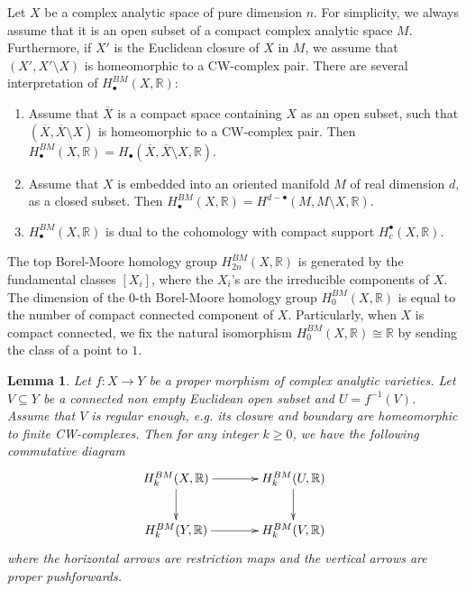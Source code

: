 \documentclass[12pt]{amsart}
\newcommand{\<}{\leq}
\def\>{\geq}
\newtheorem{lemma}[theorem]{Lemma}
\theoremstyle{remark}
\theoremstyle{definition}
\theoremstyle{definition}
\numberwithin{equation}{section}
\theoremstyle{definition}
\theoremstyle{definition}
\begin{document}
Let $X$ be a complex analytic space of pure dimension $n$. 
For simplicity, we always assume that it is an open subset of a compact complex analytic space $M$. 
Furthermore, if ${X}'$ is the Euclidean closure of $X$ in $M$, we assume that $( {X}',  {X}'\setminus X)$ is homeomorphic to a   CW-complex pair.  
There are several interpretation of $H^{BM}_\bullet(X, \mathbb{R})$: 
\begin{enumerate}
\item Assume that $\overline{X}$ is a compact space  containing $X$ as an open subset, such that $(\overline{X}, \overline X\setminus X)$ is homeomorphic to a CW-complex pair. 
Then $H^{BM}_\bullet(X, \mathbb{R}) = H_\bullet (\overline{X}, \overline{X}\setminus X, \mathbb{R}).$

\item Assume that $X$ is embedded into an oriented manifold $M$ of real dimension $d$, as a closed subset. 
Then  $H^{BM}_\bullet(X, \mathbb{R}) = H^{d-\bullet} (M, M\setminus X, \mathbb{R}).$

\item $H^{BM}_\bullet(X, \mathbb{R})$ is dual to the cohomology with compact support $H^\bullet_c(X,\mathbb{R})$. 
\end{enumerate}
 


The top Borel-Moore homology group $H^{BM}_{2n}(X, \mathbb{R})$ is generated by the fundamental classes  $[X_i]$, where the $X_i$'s are the irreducible components of $X$.  
The dimension of the $0$-th  Borel-Moore homology group $H^{BM}_{0}(X, \mathbb{R})$ is equal to the number of compact connected component of $X$.  
Particularly, when $X$ is compact connected,  we fix the natural isomorphism $H^{BM}_{0}(X, \mathbb{R}) \cong \mathbb{R}$ by sending the class of a point to $1$.


\begin{lemma}
\label{lemma:BM-commute-basechange}
Let $f\colon X\to Y$ be a proper morphism of complex analytic varieties. 
Let $V\subseteq Y$ be a connected non empty Euclidean open subset and $U=f^{-1}(V)$. 
Assume that $V$ is regular enough, \textit{e.g.} its closure and boundary are homeomorphic to finite CW-complexes. 
Then  for any integer $k\> 0$, we have the following commutative diagram 
\begin{equation*}
  \xymatrixcolsep{3pc}
  \xymatrix{ 
  H^{BM}_k(X,\mathbb{R}) \ar[r] \ar[d] & H^{BM}_k(U,\mathbb{R}) \ar[d]\\
  H^{BM}_k(Y,\mathbb{R}) \ar[r] &  H^{BM}_k(V,\mathbb{R})
  }
\end{equation*}
where the horizontal arrows are restriction maps and the vertical arrows are proper pushforwards.
\end{lemma} 
\end{document}
